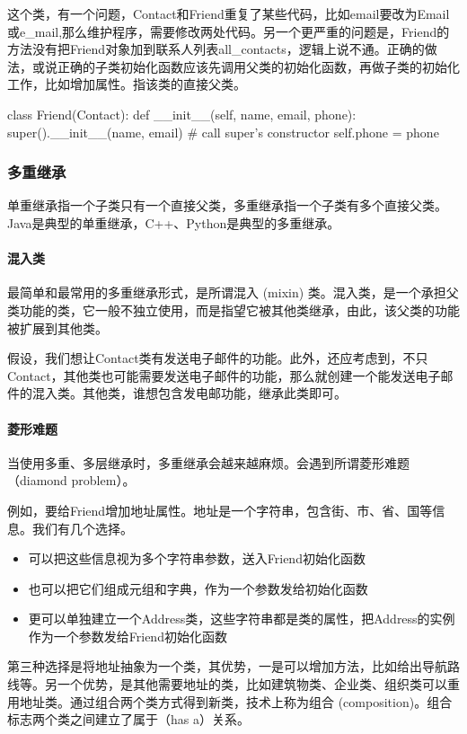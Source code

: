 这个类，有一个问题，Contact和Friend重复了某些代码，比如email要改为Email或e\_mail,那么维护程序，需要修改两处代码。另一个更严重的问题是，Friend的方法没有把Friend对象加到联系人列表all\_contacts，逻辑上说不通。正确的做法，或说正确的子类初始化函数应该先调用父类的初始化函数，再做子类的初始化工作，比如增加属性。指该类的直接父类。
\begin{python}
class Friend(Contact):
    def __init__(self, name, email, phone):
        super().__init__(name, email)  # call super's constructor
        self.phone = phone
\end{python}
\subsubsection{多重继承}
单重继承指一个子类只有一个直接父类，多重继承指一个子类有多个直接父类。Java是典型的单重继承，C++、Python是典型的多重继承。
\paragraph{混入类}
最简单和最常用的多重继承形式，是所谓混入 (mixin) 类。混入类，是一个承担父类功能的类，它一般不独立使用，而是指望它被其他类继承，由此，该父类的功能被扩展到其他类。

假设，我们想让Contact类有发送电子邮件的功能。此外，还应考虑到，不只Contact，其他类也可能需要发送电子邮件的功能，那么就创建一个能发送电子邮件的混入类。其他类，谁想包含发电邮功能，继承此类即可。
\paragraph{菱形难题}
当使用多重、多层继承时，多重继承会越来越麻烦。会遇到所谓菱形难题（diamond problem）。

例如，要给Friend增加地址属性。地址是一个字符串，包含街、市、省、国等信息。我们有几个选择。
\begin{itemize}
\item 可以把这些信息视为多个字符串参数，送入Friend初始化函数
\item 也可以把它们组成元组和字典，作为一个参数发给初始化函数
\item 更可以单独建立一个Address类，这些字符串都是类的属性，把Address的实例作为一个参数发给Friend初始化函数
\end{itemize}
第三种选择是将地址抽象为一个类，其优势，一是可以增加方法，比如给出导航路线等。另一个优势，是其他需要地址的类，比如建筑物类、企业类、组织类可以重用地址类。通过组合两个类方式得到新类，技术上称为组合 (composition)。组合标志两个类之间建立了属于（has a）关系。

